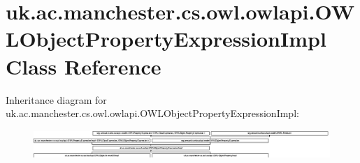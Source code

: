 \hypertarget{classuk_1_1ac_1_1manchester_1_1cs_1_1owl_1_1owlapi_1_1_o_w_l_object_property_expression_impl}{\section{uk.\-ac.\-manchester.\-cs.\-owl.\-owlapi.\-O\-W\-L\-Object\-Property\-Expression\-Impl Class Reference}
\label{classuk_1_1ac_1_1manchester_1_1cs_1_1owl_1_1owlapi_1_1_o_w_l_object_property_expression_impl}
}
Inheritance diagram for uk.\-ac.\-manchester.\-cs.\-owl.\-owlapi.\-O\-W\-L\-Object\-Property\-Expression\-Impl\-:\begin{figure}[H]
\begin{center}
\leavevmode
\includegraphics[height=1.056106cm]{classuk_1_1ac_1_1manchester_1_1cs_1_1owl_1_1owlapi_1_1_o_w_l_object_property_expression_impl}
\end{center}
\end{figure}

